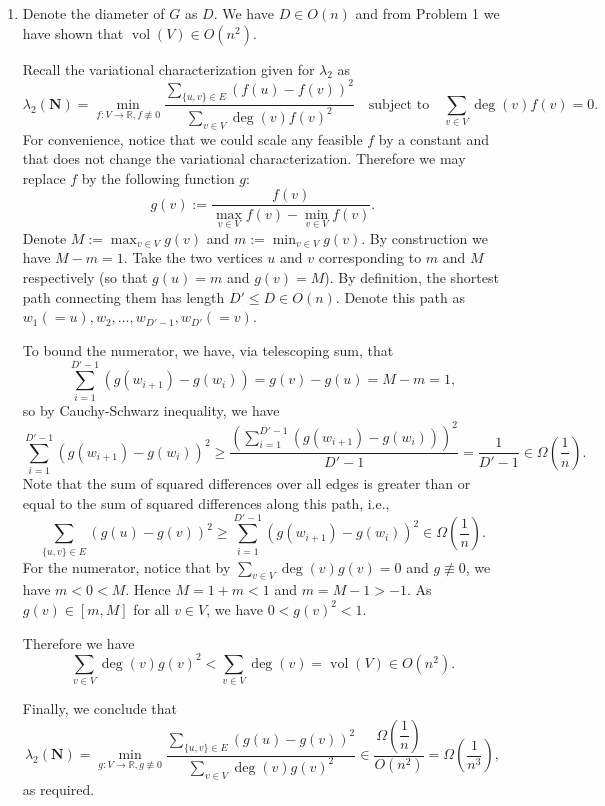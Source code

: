 \documentclass[12pt]{article}
\DeclareMathOperator{\vol}{vol}
\begin{document}
\begin{enumerate}[label=\alph*., font=\bfseries]
Indeed, we have
\begin{align*}
    \sum_{\{u,v\}\in E}\left(f(u)-f(v)\right)^2&=\underbrace{\sum_{i=0}^{m-1}\left(\left(1-\frac{2i}{m}\right)-\left(1-\frac{2(i+1)}{m}\right)\right)^2}_{\text{all edges in }P}\\
    &+\underbrace{\left(1-\left(1-\frac{2\cdot 0}{m}\right)\right)^2}_{\text{the edge }\{v_A,v_0\}}+\underbrace{\left(\left(1-\frac{2\cdot m}{m}\right)-(-1)\right)^2}_{\text{the edge }\{v_m,v_B\}}\\
    &=\frac{4}{m}+0+0\in\Theta\left(\frac{1}{n}\right).
\end{align*}

Putting together, we have
$$\lambda_2(\mathbf{N})\le\frac{\Theta\left(\dfrac{1}{n}\right)}{\Theta\left(n^2\right)}\in O\left(\frac{1}{n^3}\right),$$as required.
\item Denote the diameter of $G$ as $D$. We have $D\in O(n)$ and from Problem 1 we have shown that $\vol(V)\in O\left(n^2\right)$.

Recall the variational characterization given for $\lambda_2$ as
$$\lambda_2(\mathbf{N})=\min_{f:V\to\mathbb R,f\not\equiv 0}\frac{\sum_{\{u,v\}\in E}\left(f(u)-f(v)\right)^2}{\sum_{v\in V}\deg(v)f(v)^2}\quad \text{subject to}\quad\sum_{v\in V}\deg(v)f(v)=0.$$
For convenience, notice that we could scale any feasible $f$ by a constant and that does not change the variational characterization. Therefore we may replace $f$ by the following function $g$:
$$g(v):=\dfrac{f(v)}{\displaystyle\max_{v\in V}f(v)-\min_{v\in V}f(v)}.$$
Denote $M:=\displaystyle\max_{v\in V}g(v)$ and $m:=\displaystyle\min_{v\in V}g(v)$. By construction we have $M-m=1$. Take the two vertices $u$ and $v$ corresponding to $m$ and $M$ respectively (so that $g(u)=m$ and $g(v)=M$). By definition, the shortest path connecting them has length $D'\le D\in O(n)$. Denote this path as $w_1(=u),w_2,\dots,w_{D'-1},w_{D'}(=v)$.

To bound the numerator, we have, via telescoping sum, that
$$\sum_{i=1}^{D'-1}\left(g(w_{i+1})-g(w_i)\right)=g(v)-g(u)=M-m=1,$$
so by Cauchy-Schwarz inequality, we have
$$\sum_{i=1}^{D'-1}\left(g(w_{i+1})-g(w_i)\right)^2\ge\frac{\left(\sum_{i=1}^{D'-1}\left(g(w_{i+1})-g(w_i)\right)\right)^2}{D'-1}=\frac{1}{D'-1}\in\Omega\left(\frac 1 n\right).$$
Note that the sum of squared differences over all edges is greater than or equal to the sum of squared differences along this path, i.e.,
$$\sum_{\{u,v\}\in E}(g(u)-g(v))^2\ge\sum_{i=1}^{D'-1}\left(g(w_{i+1})-g(w_i)\right)^2\in\Omega\left(\frac 1 n\right).$$
For the numerator, notice that by $\sum_{v\in V}\deg(v)g(v)=0$ and $g\not\equiv 0$, we have $m<0<M$. Hence $M=1+m<1$ and $m=M-1>-1$. As $g(v)\in[m,M]$ for all $v\in V$, we have $0<g(v)^2<1$.

Therefore we have
$$\sum_{v\in V}\deg(v)g(v)^2<\sum_{v\in V}\deg(v)=\vol(V)\in O\left(n^2\right).$$

Finally, we conclude that
$$\lambda_2(\mathbf{N})=\min_{g:V\to\mathbb R,g\not\equiv 0}\frac{\sum_{\{u,v\}\in E}\left(g(u)-g(v)\right)^2}{\sum_{v\in V}\deg(v)g(v)^2}\in\frac{\Omega\left(\dfrac 1 n\right)}{O\left(n^2\right)}=\Omega\left(\frac{1}{n^3}\right),$$as required.
\end{enumerate}
\end{document}

